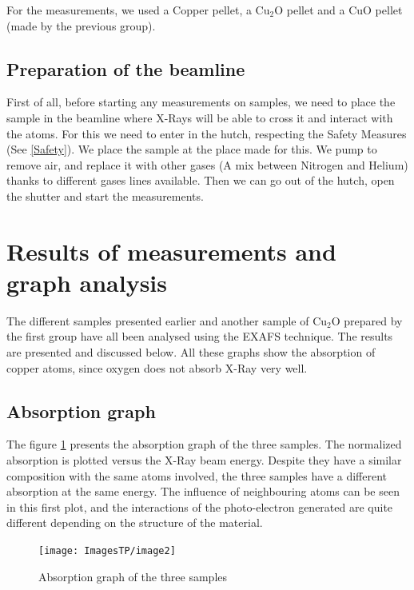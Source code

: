 \documentclass[11pt,a4paper,oneside]{report}
\begin{document}
For the measurements, we used a Copper pellet, a Cu$_2$O pellet and a CuO pellet (made by the previous group).

\subsection{Preparation of the beamline}

First of all, before starting any measurements on samples, we need to place the sample in the beamline where X-Rays will be able to cross it and interact with the atoms. For this we need to enter in the hutch, respecting the Safety Measures (See \ref{Safety}). We place the sample at the place made for this. We pump to remove air, and replace it with other gases (A mix between Nitrogen and Helium) thanks to different gases lines available. Then we can go out of the hutch, open the shutter and start the measurements.

\section{Results of measurements and graph analysis} \label{results}

The different samples presented earlier and another sample of Cu$_2$O prepared by the first group have all been analysed using the EXAFS technique. The results are presented and discussed below. All these graphs show the absorption of copper atoms, since oxygen does not absorb X-Ray very well.

\subsection{Absorption graph}
The figure \ref{graph1} presents the absorption graph of the three samples. The normalized absorption is plotted versus the X-Ray beam energy. Despite they have a similar composition with the same atoms involved, the three samples have a different absorption at the same energy. The influence of neighbouring atoms can be seen in this first plot, and the interactions of the photo-electron generated are quite different depending on the structure of the material.
\begin{figure}[H]
    \begin{center}
        \texttt{[image: ImagesTP/image2]}
        \caption{Absorption graph of the three samples}
        \label{graph1}
    \end{center}
\end{figure}
\end{document}
